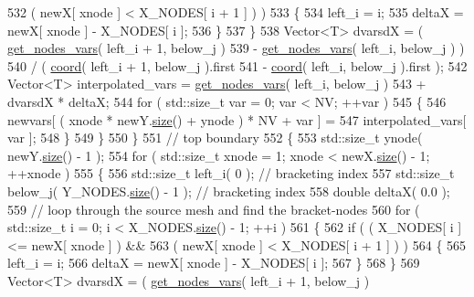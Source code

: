 \begin{DoxyCode}
532                ( newX[ xnode ] < X\_NODES[ i + 1 ] ) )
533           \{
534             left\_i = i;
535             deltaX = newX[ xnode ] - X\_NODES[ i ];
536           \}
537         \}
538         Vector<T> dvarsdX = ( \hyperlink{classLuna_1_1Mesh2D_ae91c7515960ecedf43e4ed3f411080a1}{get\_nodes\_vars}( left\_i + 1, below\_j )
539                               - \hyperlink{classLuna_1_1Mesh2D_ae91c7515960ecedf43e4ed3f411080a1}{get\_nodes\_vars}( left\_i, below\_j ) )
540                            / ( \hyperlink{classLuna_1_1Mesh2D_add4d12155922731ccf59fe4454699eed}{coord}( left\_i + 1, below\_j ).first
541                               - \hyperlink{classLuna_1_1Mesh2D_add4d12155922731ccf59fe4454699eed}{coord}( left\_i, below\_j ).first );
542         Vector<T> interpolated\_vars =   \hyperlink{classLuna_1_1Mesh2D_ae91c7515960ecedf43e4ed3f411080a1}{get\_nodes\_vars}( left\_i, below\_j )
543                                       + dvarsdX * deltaX;
544         \textcolor{keywordflow}{for} ( std::size\_t var = 0; var < NV; ++var )
545         \{
546           newvars[ ( xnode * newY.\hyperlink{classLuna_1_1Vector_ac9b6ed7a0df401728f27c193fbc8f4d8}{size}() + ynode ) * NV + var ] =
547                                                        interpolated\_vars[ var ];
548         \}
549       \}
550     \}
551     \textcolor{comment}{// top boundary}
552     \{
553       std::size\_t ynode( newY.\hyperlink{classLuna_1_1Vector_ac9b6ed7a0df401728f27c193fbc8f4d8}{size}() - 1 );
554       \textcolor{keywordflow}{for} ( std::size\_t xnode = 1; xnode < newX.\hyperlink{classLuna_1_1Vector_ac9b6ed7a0df401728f27c193fbc8f4d8}{size}() - 1; ++xnode )
555       \{
556         std::size\_t left\_i( 0 );  \textcolor{comment}{// bracketing index}
557         std::size\_t below\_j( Y\_NODES.\hyperlink{classLuna_1_1Vector_ac9b6ed7a0df401728f27c193fbc8f4d8}{size}() - 1 ); \textcolor{comment}{// bracketing index}
558         \textcolor{keywordtype}{double} deltaX( 0.0 );
559         \textcolor{comment}{// loop through the source mesh and find the bracket-nodes}
560         \textcolor{keywordflow}{for} ( std::size\_t i = 0; i < X\_NODES.\hyperlink{classLuna_1_1Vector_ac9b6ed7a0df401728f27c193fbc8f4d8}{size}() - 1; ++i )
561         \{
562           \textcolor{keywordflow}{if} ( ( X\_NODES[ i ] <= newX[ xnode ] ) &&
563                ( newX[ xnode ] < X\_NODES[ i + 1 ] ) )
564           \{
565             left\_i = i;
566             deltaX = newX[ xnode ] - X\_NODES[ i ];
567           \}
568         \}
569         Vector<T> dvarsdX = ( \hyperlink{classLuna_1_1Mesh2D_ae91c7515960ecedf43e4ed3f411080a1}{get\_nodes\_vars}( left\_i + 1, below\_j )

\end{DoxyCode}
